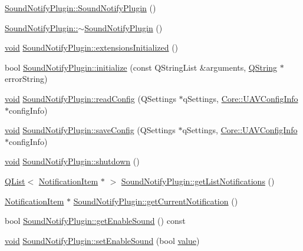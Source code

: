 \begin{DoxyCompactItemize}
\item 
\hyperlink{group__notifyplugin_ga4ac47c6cde68d633ead0764296f9a737}{Sound\-Notify\-Plugin\-::\-Sound\-Notify\-Plugin} ()
\item 
\hyperlink{group__notifyplugin_ga41104bb06fbf94801a798514294d39c3}{Sound\-Notify\-Plugin\-::$\sim$\-Sound\-Notify\-Plugin} ()
\item 
\hyperlink{group___u_a_v_objects_plugin_ga444cf2ff3f0ecbe028adce838d373f5c}{void} \hyperlink{group__notifyplugin_gad704ab0c43392e54f01882f7883f689f}{Sound\-Notify\-Plugin\-::extensions\-Initialized} ()
\item 
bool \hyperlink{group__notifyplugin_ga5c84bbeb8237b65ecce93f518a26384d}{Sound\-Notify\-Plugin\-::initialize} (const Q\-String\-List \&arguments, \hyperlink{group___u_a_v_objects_plugin_gab9d252f49c333c94a72f97ce3105a32d}{Q\-String} $\ast$error\-String)
\item 
\hyperlink{group___u_a_v_objects_plugin_ga444cf2ff3f0ecbe028adce838d373f5c}{void} \hyperlink{group__notifyplugin_gae783274f70106d7f8a50f51b4d98221f}{Sound\-Notify\-Plugin\-::read\-Config} (Q\-Settings $\ast$q\-Settings, \hyperlink{class_core_1_1_u_a_v_config_info}{Core\-::\-U\-A\-V\-Config\-Info} $\ast$config\-Info)
\item 
\hyperlink{group___u_a_v_objects_plugin_ga444cf2ff3f0ecbe028adce838d373f5c}{void} \hyperlink{group__notifyplugin_ga591d270cfaee4d5107899bf24ac83289}{Sound\-Notify\-Plugin\-::save\-Config} (Q\-Settings $\ast$q\-Settings, \hyperlink{class_core_1_1_u_a_v_config_info}{Core\-::\-U\-A\-V\-Config\-Info} $\ast$config\-Info)
\item 
\hyperlink{group___u_a_v_objects_plugin_ga444cf2ff3f0ecbe028adce838d373f5c}{void} \hyperlink{group__notifyplugin_ga2f91d9771233415fa6d23a8087331df9}{Sound\-Notify\-Plugin\-::shutdown} ()
\item 
\hyperlink{class_q_list}{Q\-List}$<$ \hyperlink{class_notification_item}{Notification\-Item} $\ast$ $>$ \hyperlink{group__notifyplugin_ga949c06b617fbadfd2c844d9f29351085}{Sound\-Notify\-Plugin\-::get\-List\-Notifications} ()
\item 
\hyperlink{class_notification_item}{Notification\-Item} $\ast$ \hyperlink{group__notifyplugin_ga286a323009d17d90a51abfbc288bdc68}{Sound\-Notify\-Plugin\-::get\-Current\-Notification} ()
\item 
bool \hyperlink{group__notifyplugin_ga25e91be7ff9c99dcb12a2e0931cec530}{Sound\-Notify\-Plugin\-::get\-Enable\-Sound} () const 
\item 
\hyperlink{group___u_a_v_objects_plugin_ga444cf2ff3f0ecbe028adce838d373f5c}{void} \hyperlink{group__notifyplugin_ga25cf9833d9cea621e4168a81ee0e9d05}{Sound\-Notify\-Plugin\-::set\-Enable\-Sound} (bool \hyperlink{glext_8h_aa0e2e9cea7f208d28acda0480144beb0}{value})

\end{DoxyCompactItemize}

